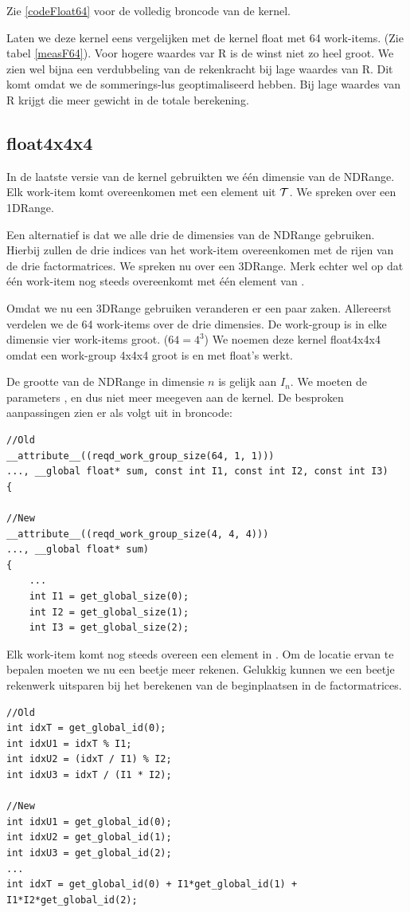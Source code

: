 Zie \ref{codeFloat64} voor de volledig broncode van de kernel.

Laten we deze kernel eens vergelijken met de kernel float met 64 work-items. (Zie tabel \ref{measF64}). Voor hogere waardes var R is de winst niet zo heel groot. We zien wel bijna een verdubbeling van de rekenkracht bij lage waardes van R. Dit komt omdat we de sommerings-lus geoptimaliseerd hebben. Bij lage waardes van R krijgt die meer gewicht in de totale berekening.

\subsection{float4x4x4}
In de laatste versie van de kernel gebruikten we \'e\'en dimensie van de NDRange. Elk work-item komt overeenkomen met een element uit $\mathcal{T}$. We spreken over een 1DRange.

Een alternatief is dat we alle drie de dimensies van de NDRange gebruiken. Hierbij zullen de drie indices van het work-item overeenkomen met de rijen van de drie factormatrices. We spreken nu over een 3DRange. Merk echter wel op dat \'e\'en work-item nog steeds overeenkomt met \'e\'en element van \TT.

Omdat we nu een 3DRange gebruiken veranderen er een paar zaken. Allereerst verdelen we de 64 work-items over de drie dimensies. De work-group is in elke dimensie vier work-items groot. ($64 = 4^3$) We noemen deze kernel float4x4x4 omdat een work-group 4x4x4 groot is en met float's werkt.

De grootte van de NDRange in dimensie $n$ is gelijk aan $I_n$. We moeten de parameters ,  en  dus niet meer meegeven aan de kernel. De besproken aanpassingen zien er als volgt uit in broncode:
\begin{lstlisting}
//Old
__attribute__((reqd_work_group_size(64, 1, 1)))
..., __global float* sum, const int I1, const int I2, const int I3)
{

//New
__attribute__((reqd_work_group_size(4, 4, 4)))
..., __global float* sum)
{
	...
	int I1 = get_global_size(0);
	int I2 = get_global_size(1);
	int I3 = get_global_size(2);
\end{lstlisting}

Elk work-item komt nog steeds overeen een element in \TT{}. Om de locatie ervan te bepalen moeten we nu een beetje meer rekenen. Gelukkig kunnen we een beetje rekenwerk uitsparen bij het berekenen van de beginplaatsen in de factormatrices.
\begin{lstlisting}
//Old
int idxT = get_global_id(0);
int idxU1 = idxT % I1;
int idxU2 = (idxT / I1) % I2;
int idxU3 = idxT / (I1 * I2);

//New
int idxU1 = get_global_id(0);
int idxU2 = get_global_id(1);
int idxU3 = get_global_id(2);
...
int idxT = get_global_id(0) + I1*get_global_id(1) + I1*I2*get_global_id(2);
\end{lstlisting}

